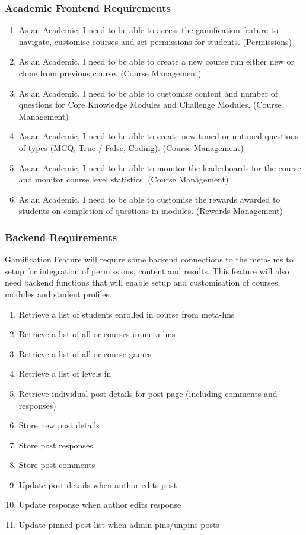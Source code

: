 \subsubsection{Academic Frontend Requirements}
\begin{enumerate}
    \item As an Academic, I need to be able to access the gamification feature to navigate, customise courses and set permissions for students. (Permissions)
    \item As an Academic, I need to be able to create a new course run either new or clone from previous course. (Course Management)
    \item As an Academic, I need to be able to customise content and number of questions for Core Knowledge Modules and Challenge Modules. (Course Management)
    \item As an Academic, I need to be able to create new timed or untimed questions of types (MCQ, True / False, Coding). (Course Management)
    \item As an Academic, I need to be able to monitor the leaderboards for the course and monitor course level statistics. (Course Management)
    \item As an Academic, I need to be able to customise the rewards awarded to students on completion of questions in modules. (Rewards Management)
\end{enumerate}

\newpage

\subsubsection{Backend Requirements}
Gamification Feature will require some backend connections to the meta-lms to setup for integration of permissions, content and results.
This feature will also need backend functions that will enable setup and customisation of courses, modules and student profiles.

\begin{enumerate}
    \item Retrieve a list of students enrolled in course from meta-lms
    \item Retrieve a list of all or courses in meta-lms
    \item Retrieve a list of all or course games
    \item Retrieve a list of levels in 
    \item Retrieve individual post details for post page (including comments and responses)
    \item Store new post details
    \item Store post responses
    \item Store post comments
    \item Update post details when author edits post
    \item Update response when author edits response
    \item Update pinned post list when admin pins/unpins posts
\end{enumerate}

